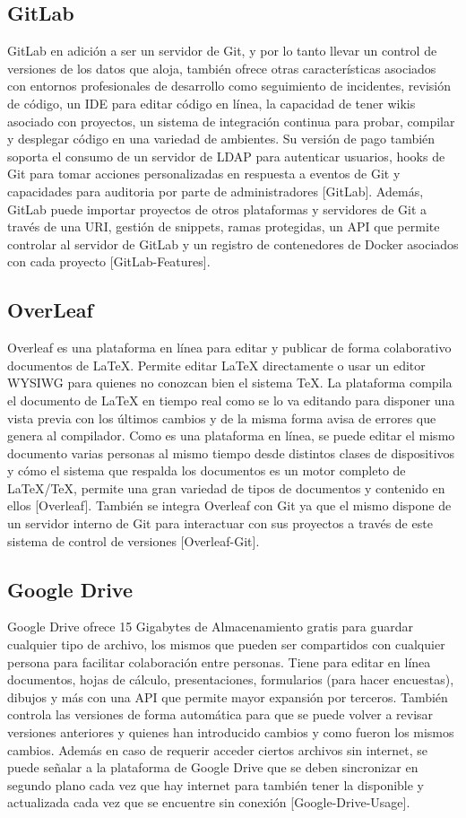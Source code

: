 \subsection{GitLab}
GitLab en adición a ser un servidor de Git, y por lo tanto llevar un control de versiones de los datos que aloja, también ofrece otras características asociados con entornos profesionales de desarrollo como seguimiento de incidentes, revisión de código, un IDE para editar código en línea, la capacidad de tener wikis asociado con proyectos, un sistema de integración continua para probar, compilar y desplegar código en una variedad de ambientes. Su versión de pago también soporta el consumo de un servidor de LDAP para autenticar usuarios, hooks de Git para tomar acciones personalizadas en respuesta a eventos de Git y capacidades para auditoria por parte de administradores [GitLab]. Además, GitLab puede importar proyectos de otros plataformas y servidores de Git a través de una URI, gestión de snippets, ramas protegidas, un API que permite controlar al servidor de GitLab y un registro de contenedores de Docker asociados con cada proyecto [GitLab-Features].

\subsection{OverLeaf}
Overleaf es una plataforma en línea para editar y publicar de forma colaborativo documentos de LaTeX. Permite editar LaTeX directamente o usar un editor WYSIWG para quienes no conozcan bien el sistema TeX. La plataforma compila el documento de LaTeX en tiempo real como se lo va editando para disponer una vista previa con los últimos cambios y de la misma forma avisa de errores que genera al compilador. Como es una plataforma en línea, se puede editar el mismo documento varias personas al mismo tiempo desde distintos clases de dispositivos y cómo el sistema que respalda los documentos es un motor completo de LaTeX/TeX, permite una gran variedad de tipos de documentos y contenido en ellos [Overleaf]. También se integra Overleaf con Git ya que el mismo dispone de un servidor interno de Git para interactuar con sus proyectos a través de este sistema de control de versiones [Overleaf-Git].

\subsection{Google Drive}
Google Drive ofrece 15 Gigabytes de Almacenamiento gratis para guardar cualquier tipo de archivo, los mismos que pueden ser compartidos con cualquier persona para facilitar colaboración entre personas. Tiene para editar en línea documentos, hojas de cálculo, presentaciones, formularios (para hacer encuestas), dibujos y más con una API que permite mayor expansión por terceros. También controla las versiones de forma automática para que se puede volver a revisar versiones anteriores y quienes han introducido cambios y como fueron los mismos cambios. Además en caso de requerir acceder ciertos archivos sin internet, se puede señalar a la plataforma de Google Drive que se deben sincronizar en segundo plano cada vez que hay internet para también tener la disponible y actualizada cada vez que se encuentre sin conexión [Google-Drive-Usage].

